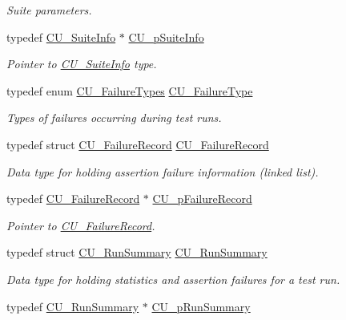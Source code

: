 \begin{DoxyCompactItemize}
\begin{DoxyCompactList}\small\item\em Suite parameters. \end{DoxyCompactList}\item 
typedef \hyperlink{structCU__SuiteInfo}{C\-U\-\_\-\-Suite\-Info} $\ast$ \hyperlink{group__Framework_gaf0deaec93829917ef410128e19ab8887}{C\-U\-\_\-p\-Suite\-Info}
\begin{DoxyCompactList}\small\item\em Pointer to \hyperlink{structCU__SuiteInfo}{C\-U\-\_\-\-Suite\-Info} type. \end{DoxyCompactList}\item 
typedef enum \hyperlink{group__Framework_gaea9b4c74f76417ce586bd5e6196f2f27}{C\-U\-\_\-\-Failure\-Types} \hyperlink{group__Framework_ga763bde9f3b5258aaca9c65512d1b2219}{C\-U\-\_\-\-Failure\-Type}
\begin{DoxyCompactList}\small\item\em Types of failures occurring during test runs. \end{DoxyCompactList}\item 
typedef struct \hyperlink{structCU__FailureRecord}{C\-U\-\_\-\-Failure\-Record} \hyperlink{group__Framework_ga5cada0980a95780d4d7c9f2f9b73d8ad}{C\-U\-\_\-\-Failure\-Record}
\begin{DoxyCompactList}\small\item\em Data type for holding assertion failure information (linked list). \end{DoxyCompactList}\item 
typedef \hyperlink{structCU__FailureRecord}{C\-U\-\_\-\-Failure\-Record} $\ast$ \hyperlink{group__Framework_gafe3d04f76bf2fac18a3b6a9fd9368308}{C\-U\-\_\-p\-Failure\-Record}
\begin{DoxyCompactList}\small\item\em Pointer to \hyperlink{structCU__FailureRecord}{C\-U\-\_\-\-Failure\-Record}. \end{DoxyCompactList}\item 
typedef struct \hyperlink{structCU__RunSummary}{C\-U\-\_\-\-Run\-Summary} \hyperlink{group__Framework_gaccf591ac5a134c3ba3a1becb7d469094}{C\-U\-\_\-\-Run\-Summary}
\begin{DoxyCompactList}\small\item\em Data type for holding statistics and assertion failures for a test run. \end{DoxyCompactList}\item 
typedef \hyperlink{structCU__RunSummary}{C\-U\-\_\-\-Run\-Summary} $\ast$ \hyperlink{group__Framework_gad47d258dca538a934dccaeab9392b391}{C\-U\-\_\-p\-Run\-Summary}

\end{DoxyCompactItemize}
